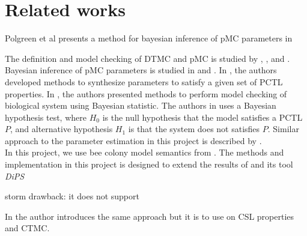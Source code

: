 \chapter{Related works}

\cite{jha2009bayesian} \cite{polgreen2016data}

\cite{molyneux2019bayesian} \cite{molyneux2020abc}

Polgreen et al \cite{polgreen2016data} presents a method for bayesian inference of pMC parameters in
\cite{haesaert2015data}

\cite{kwiatkowska2011prism}

The definition and model checking of DTMC and pMC is studied by \cite{baier2008principles},
\cite{hutschenreiter2017parametric}, and \cite{katoen2016probabilistic}.\\
Bayesian inference of pMC parameters is studied in \cite{polgreen2016data} and
. In , the authors developed methods to synthesize
parameters to satisfy a given set of PCTL properties. In \cite{jha2009bayesian}, the authors
presented methods to perform model checking of biological system using Bayesian statistic. The
authors in \cite{jha2009bayesian} uses a Bayesian hypothesis test, where $H_0$ is the null
hypothesis that the model satisfies a PCTL $P$, and alternative hypothesis $H_1$ is that the system
does not satisfies $P$. Similar approach to the parameter estimation in this project is described by
\cite{hussain2015automated}.\\
In this project, we use bee colony model semantics from \cite{hajnal2019data}. The methods and
implementation in this project is designed to extend the results of \cite{hajnal2019data} and its
tool \textit{DiPS}

storm drawback: it does not support


In \cite{molyneux2020abc} the author introduces the same approach but it is to use on CSL properties
and CTMC.